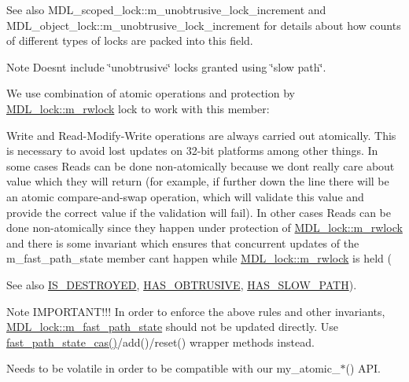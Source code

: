 \begin{DoxySeeAlso}{See also}
M\+D\+L\+\_\+scoped\+\_\+lock\+::m\+\_\+unobtrusive\+\_\+lock\+\_\+increment and M\+D\+L\+\_\+object\+\_\+lock\+::m\+\_\+unobtrusive\+\_\+lock\+\_\+increment for details about how counts of different types of locks are packed into this field.
\end{DoxySeeAlso}
\begin{DoxyNote}{Note}
Doesn\textquotesingle{}t include \char`\"{}unobtrusive\char`\"{} locks granted using \char`\"{}slow path\char`\"{}.

We use combination of atomic operations and protection by \mbox{\hyperlink{classMDL__lock_a1308b4506d8cb6d754b4f173e3aa4962}{M\+D\+L\+\_\+lock\+::m\+\_\+rwlock}} lock to work with this member\+:
\end{DoxyNote}
Write and Read-\/Modify-\/Write operations are always carried out atomically. This is necessary to avoid lost updates on 32-\/bit platforms among other things. In some cases Reads can be done non-\/atomically because we don\textquotesingle{}t really care about value which they will return (for example, if further down the line there will be an atomic compare-\/and-\/swap operation, which will validate this value and provide the correct value if the validation will fail). In other cases Reads can be done non-\/atomically since they happen under protection of \mbox{\hyperlink{classMDL__lock_a1308b4506d8cb6d754b4f173e3aa4962}{M\+D\+L\+\_\+lock\+::m\+\_\+rwlock}} and there is some invariant which ensures that concurrent updates of the m\+\_\+fast\+\_\+path\+\_\+state member can\textquotesingle{}t happen while \mbox{\hyperlink{classMDL__lock_a1308b4506d8cb6d754b4f173e3aa4962}{M\+D\+L\+\_\+lock\+::m\+\_\+rwlock}} is held (\begin{DoxySeeAlso}{See also}
\mbox{\hyperlink{classMDL__lock_a1627af1fd21d2ae76c27b39901e574a3}{I\+S\+\_\+\+D\+E\+S\+T\+R\+O\+Y\+ED}}, \mbox{\hyperlink{classMDL__lock_ac0e55394e253bd9d0988c9a7ab243a39}{H\+A\+S\+\_\+\+O\+B\+T\+R\+U\+S\+I\+VE}}, \mbox{\hyperlink{classMDL__lock_ace80291dc2f7786288cdf1cec54bcb55}{H\+A\+S\+\_\+\+S\+L\+O\+W\+\_\+\+P\+A\+TH}}).
\end{DoxySeeAlso}
\begin{DoxyNote}{Note}
I\+M\+P\+O\+R\+T\+A\+N\+T!!! In order to enforce the above rules and other invariants, \mbox{\hyperlink{classMDL__lock_ae680877b7079a862d294ccbefed6372c}{M\+D\+L\+\_\+lock\+::m\+\_\+fast\+\_\+path\+\_\+state}} should not be updated directly. Use \mbox{\hyperlink{classMDL__lock_a716b40d532b18db6c2527d1a46908c29}{fast\+\_\+path\+\_\+state\+\_\+cas()}}/add()/reset() wrapper methods instead.

Needs to be volatile in order to be compatible with our my\+\_\+atomic\+\_\+$\ast$() A\+PI. 
\end{DoxyNote}
\mbox{\label{classMDL__lock_a188dd53561f6cf6148277512b706ea74}} 
